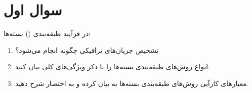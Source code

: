 \section{سوال اول}

در فرآیند طبقه‌بندی () بسته‌ها:  
\begin{enumerate}
	\item تشخیص جریان‌های ترافیکی چگونه انجام می‌شود؟
	\item انواع روش‌های طبقه‌بندی بسته‌ها را با ذکر ویژگی‌های کلی بیان کنید.
	\item معیارهای کارآیی روش‌های طبقه‌بندی بسته‌ها به بیان کرده و به اختصار شرح دهید.
\end{enumerate}


\begin{qsolve}
	
\end{qsolve}


